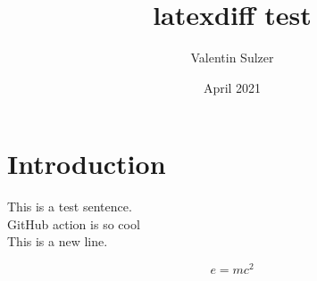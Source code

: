 \documentclass{article}
\title{latexdiff test}
\author{Valentin Sulzer}
\date{April 2021}
\begin{document}
\maketitle

\section{Introduction}

This is a test sentence.
\\GitHub action is so cool
\\This is a new line.

\begin{equation}
    e = mc^2
\end{equation}
\end{document}
